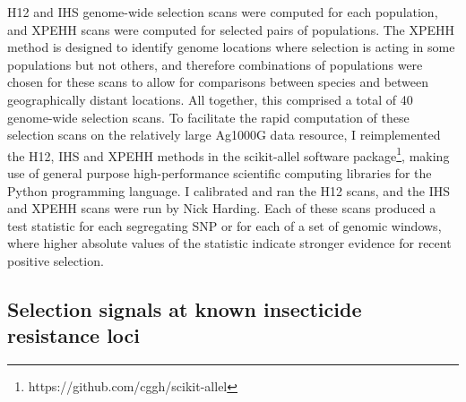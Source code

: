 \documentclass[a4paper,11pt,abstracton,hidelinks]{scrartcl}
\begin{document}
H12 and IHS genome-wide selection scans were computed for each population, and XPEHH scans were computed for selected pairs of populations.
%
The XPEHH method is designed to identify genome locations where selection is acting in some populations but not others, and therefore combinations of populations were chosen for these scans to allow for comparisons between species and between geographically distant locations.
%
All together, this comprised a total of 40 genome-wide selection scans.
%
To facilitate the rapid computation of these selection scans on the relatively large Ag1000G data resource, I reimplemented the H12, IHS and XPEHH methods in the scikit-allel software package\footnote{https://github.com/cggh/scikit-allel}, making use of general purpose high-performance scientific computing libraries for the Python programming language.
%
I calibrated and ran the H12 scans, and the IHS and XPEHH scans were run by Nick Harding.
%
Each of these scans produced a test statistic for each segregating SNP or for each of a set of genomic windows, where higher absolute values of the statistic indicate stronger evidence for recent positive selection.


\subsection{Selection signals at known insecticide resistance loci}\label{subsec:known-loci}
\end{document}
